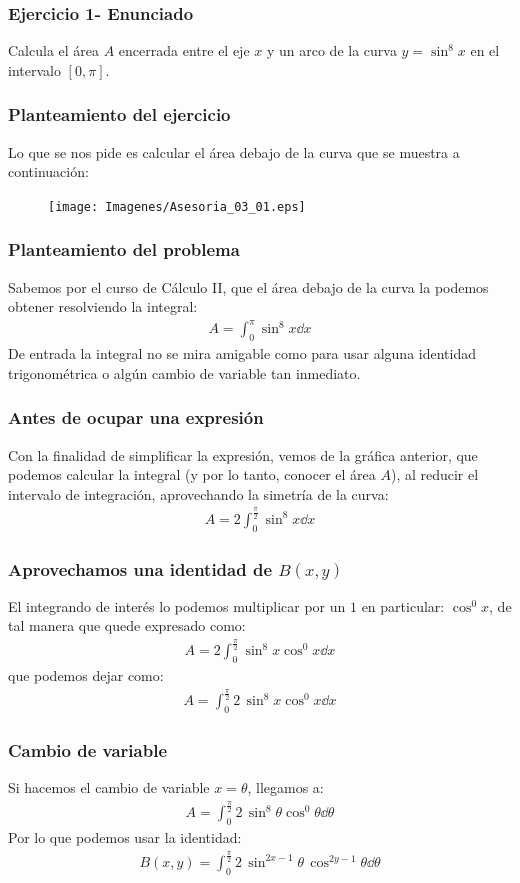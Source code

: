 \begin{frame}
\frametitle{Ejercicio 1-  Enunciado}
Calcula el área $A$ encerrada entre el eje $x$ y un arco de la curva $y = \sin^{8} x$ en el intervalo $[0, \pi]$.
\end{frame}
\begin{frame}
\frametitle{Planteamiento del ejercicio}
Lo que se nos pide es calcular el área debajo de la curva que se muestra a continuación:
\begin{figure}
    \centering
    \texttt{[image: Imagenes/Asesoria\_03\_01.eps]}
\end{figure}
\end{frame}
\begin{frame}
\frametitle{Planteamiento del problema}
Sabemos por el curso de Cálculo II, que el área debajo de la curva la podemos obtener resolviendo la integral:
\begin{align*}
A = \int_{0}^{\pi} \sin^{8} x \dd{x}
\end{align*}
\pause
De entrada la integral no se mira amigable como para usar alguna identidad trigonométrica o algún cambio de variable tan inmediato.
\end{frame}
\begin{frame}
\frametitle{Antes de ocupar una expresión}
Con la finalidad de simplificar la expresión, vemos de la gráfica anterior, que podemos calcular la integral (y por lo tanto, conocer el área $A$), al reducir el intervalo de integración, aprovechando la simetría de la curva:
\begin{align*}
A = 2 \int_{0}^{\frac{\pi}{2}} \sin^{8} x \dd{x}
\end{align*}
\end{frame}
\begin{frame}
\frametitle{Aprovechamos una identidad de $B(x,y)$}
El integrando de interés lo podemos multiplicar por un $1$ en particular: $\cos^{0} x$, de tal manera que quede expresado como:
\begin{align*}
A = 2 \int_{0}^{\frac{\pi}{2}} \sin^{8} x \cos^{0} x \dd{x}
\end{align*}
\pause
que podemos dejar como:
\begin{align*}
A = \int_{0}^{\frac{\pi}{2}} 2 \, \sin^{8} x \cos^{0} x \dd{x}
\end{align*}
\end{frame}
\begin{frame}
\frametitle{Cambio de variable}
Si hacemos el cambio de variable $x = \theta$, llegamos a:
\begin{align*}
A = \int_{0}^{\frac{\pi}{2}} 2 \, \sin^{8} \theta \cos^{0} \theta \dd{\theta}
\end{align*}
\pause
Por lo que podemos usar la identidad:
\begin{align*}
B(x, y) = \int_{0}^\frac{\pi}{2} 2 \, \sin^{2x-1} \theta \, \cos^{2y-1} \theta \dd{\theta}
\end{align*}
\end{frame}
